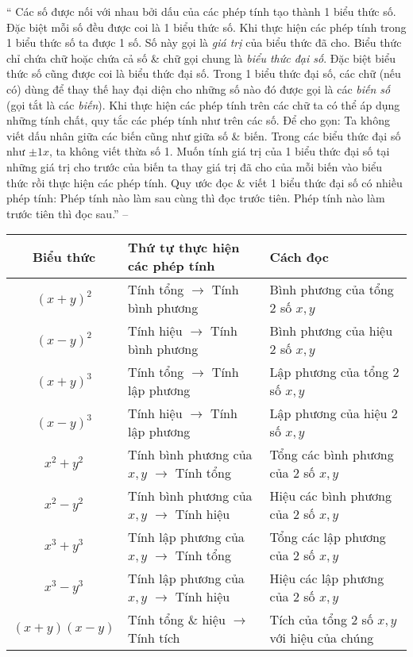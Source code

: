 \documentclass{article}
\numberwithin{equation}{section}
\begin{document}
`` Các số được nối với nhau bởi dấu của các phép tính tạo thành 1 biểu thức số. Đặc biệt mỗi số đều được coi là 1 biểu thức số. Khi thực hiện các phép tính trong 1 biểu thức số ta được 1 số. Số này gọi là \textit{giá trị} của biểu thức đã cho.  Biểu thức chỉ chứa chữ hoặc chứa cả số \& chữ gọi chung là \textit{biểu thức đại số}. Đặc biệt biểu thức số cũng được coi là biểu thức đại số. Trong 1 biểu thức đại số, các chữ (nếu có) dùng để thay thế hay đại diện cho những số nào đó được gọi là các \textit{biến số} (gọi tắt là các \textit{biến}). Khi thực hiện các phép tính trên các chữ ta có thể áp dụng những tính chất, quy tắc các phép tính như trên các số.  Để cho gọn: Ta không viết dấu nhân giữa các biến cũng như giữa số \& biến. Trong các biểu thức đại số như $\pm1x$, ta không viết thừa số 1.  Muốn tính giá trị của 1 biểu thức đại số tại những giá trị cho trước của biến ta thay giá trị đã cho của mỗi biến vào biểu thức rồi thực hiện các phép tính.  Quy ước đọc \& viết 1 biểu thức đại số có nhiều phép tính: Phép tính nào làm sau cùng thì đọc trước tiên. Phép tính nào làm trước tiên thì đọc sau.'' -- \cite[Chap. III, \S1, p. 37]{Tuyen_Toan_7}
\begin{table}[H]
	\centering
	\begin{tabular}{|c|l|l|}
		\hline
		\textbf{Biểu thức} & \textbf{Thứ tự thực hiện các phép tính} & \textbf{Cách đọc}\\
		\hline
		$(x + y)^2$ & Tính tổng $\to$ Tính bình phương & Bình phương của tổng 2 số $x,y$\\
		\hline
		$(x - y)^2$ & Tính hiệu $\to$ Tính bình phương & Bình phương của hiệu 2 số $x,y$\\
		\hline
		$(x + y)^3$ & Tính tổng $\to$ Tính lập phương & Lập phương của tổng 2 số $x,y$ \\
		\hline		
		$(x - y)^3$ & Tính hiệu $\to$ Tính lập phương & Lập phương của hiệu 2 số $x,y$ \\
		\hline
		$x^2 + y^2$ & Tính bình phương của $x,y$ $\to$ Tính tổng & Tổng các bình phương của 2 số $x,y$\\
		\hline
		$x^2 - y^2$ & Tính bình phương của $x,y$ $\to$ Tính hiệu & Hiệu các bình phương của 2 số $x,y$\\
		\hline
		$x^3 + y^3$ & Tính lập phương của $x,y$ $\to$ Tính tổng & Tổng các lập phương của 2 số $x,y$\\
		\hline
		$x^3 - y^3$ & Tính lập phương của $x,y$ $\to$ Tính hiệu & Hiệu các lập phương của 2 số $x,y$\\
		\hline
		$(x + y)(x - y)$ & Tính tổng \& hiệu $\to$ Tính tích & Tích của tổng 2 số $x,y$ với hiệu của chúng\\
		\hline
	\end{tabular}
\end{table}
\end{document}
